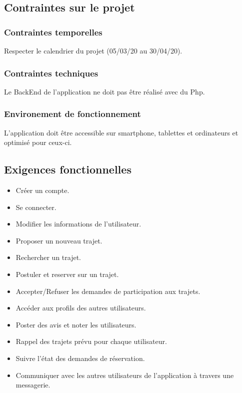 \documentclass{article}
\begin{document}
\subsection{Contraintes sur le projet}
\subsubsection*{Contraintes temporelles}
Respecter le calendrier du projet (05/03/20  au 30/04/20).

\subsubsection*{Contraintes techniques}
Le BackEnd de l'application ne doit pas être réalisé avec du Php.

\subsubsection*{Environement de fonctionnement}
L'application doit être accessible sur smartphone, tablettes et ordinateurs et optimisé pour ceux-ci.

\subsection{Exigences fonctionnelles}
\begin{itemize}
    \item Créer un compte.
    \item Se connecter.
    \item Modifier les informations de l'utilisateur.
    \item Proposer un nouveau trajet.
    \item Rechercher un trajet.
    \item Postuler et reserver sur un trajet.
    \item Accepter/Refuser les demandes de participation aux trajets.
    \item Accéder aux profils des autres utilisateurs.
    \item Poster des avis et noter les utilisateurs.
    \item Rappel des trajets prévu pour chaque utilisateur.
    \item Suivre l'état des demandes de réservation.
    \item Communiquer avec les autres utilisateurs de l'application à travers une messagerie.
\end{itemize}
\end{document}

